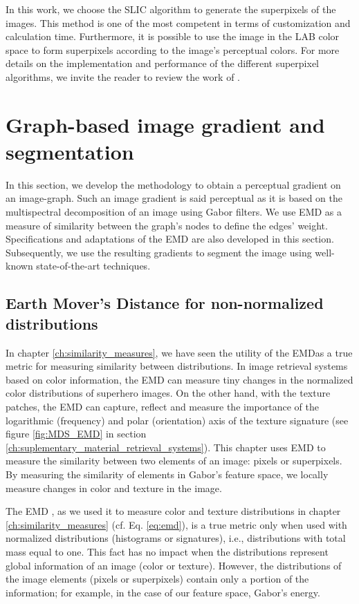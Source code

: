 In this work, we choose the SLIC algorithm to generate the superpixels of the images. This method is one of the most competent in terms of customization and calculation time. Furthermore, it is possible to use the image in the LAB color space to form superpixels according to the image's perceptual colors. For more details on the implementation and performance of the different superpixel algorithms, we invite the reader to review the work of \cite{Wang.Liu.ea:SP:2017}.

\section{Graph-based image gradient and segmentation}

In this section, we develop the methodology to obtain a perceptual gradient on an image-graph. Such an image gradient is said perceptual as it is based on the multispectral decomposition of an image using Gabor filters. We use EMD as a measure of similarity between the graph's nodes to define the edges' weight. Specifications and adaptations of the EMD are also developed in this section. Subsequently, we use the resulting gradients to segment the image using well-known state-of-the-art techniques.  

\subsection{Earth Mover's Distance for non-normalized distributions}
In chapter \ref{ch:similarity_measures}, we have seen the utility of the EMDas a true metric for measuring similarity between distributions. In image retrieval systems based on color information, the EMD can measure tiny changes in the normalized color distributions of superhero images. On the other hand, with the texture patches, the EMD can capture, reflect and measure the importance of the logarithmic (frequency) and polar (orientation) axis of the texture signature (see figure \ref{fig:MDS_EMD} in section \ref{ch:suplementary_material_retrieval_systems}). This chapter uses EMD to measure the similarity between two elements of an image: pixels or superpixels. By measuring the similarity of elements in Gabor's feature space, we locally measure changes in color and texture in the image. 

The EMD \citep{Rubner.Tomasi.ea:IJCV:2000} , as we used it to measure color and texture distributions in chapter \ref{ch:similarity_measures} (cf. Eq. \eqref{eq:emd}), is a true metric only when used with normalized distributions (histograms or signatures), i.e., distributions with total mass equal to one. This fact has no impact when the distributions represent global information of an image (color or texture). However, the distributions of the image elements (pixels or superpixels) contain only a portion of the information; for example, in the case of our feature space, Gabor's energy. 

